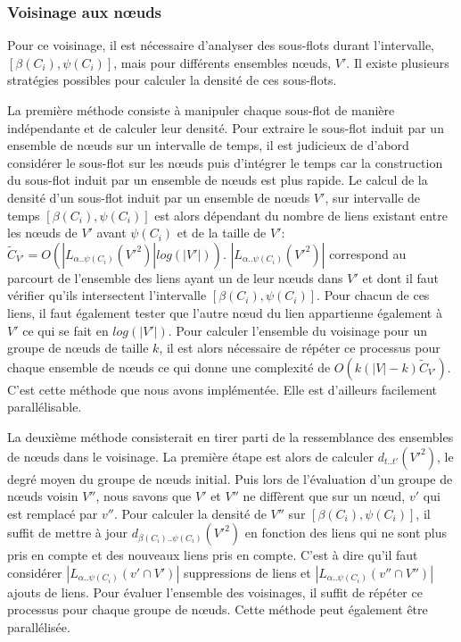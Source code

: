 \subsubsection{Voisinage aux n\oe uds}
Pour ce voisinage, il est nécessaire d'analyser des sous-flots durant l'intervalle, $[\beta(C_i),\psi(C_i)]$, mais pour différents ensembles n\oe uds, $V'$.
Il existe plusieurs stratégies possibles pour calculer la densité  de ces sous-flots. 

La première méthode consiste à manipuler chaque sous-flot de manière indépendante et de calculer leur densité.
Pour extraire le sous-flot induit par un ensemble de n\oe uds sur un intervalle de temps,
il est judicieux de d'abord considérer le sous-flot sur les n\oe uds puis d'intégrer le temps  car la construction du sous-flot induit par un ensemble de n\oe uds est plus rapide.
Le calcul de la densité d'un sous-flot induit par un ensemble de n\oe uds $V'$, sur intervalle de temps $[\beta(C_i),\psi(C_i)]$ est alors dépendant du nombre de liens existant entre les n\oe uds de $V'$ avant $\psi(C_i)$ et de la taille de $V'$: $\tilde{C}_{V'}=O(|L_{\alpha..\psi(C_i)}(V'^2)|log(|V'|))$.
$|L_{\alpha..\psi(C_i)}(V'^2)|$ correspond au parcourt de l'ensemble des liens ayant un de leur n\oe uds dans $V'$ et dont il faut vérifier  qu'ils intersectent l'intervalle $[\beta(C_i),\psi(C_i)]$.
Pour chacun de ces liens, il faut également tester que l'autre n\oe ud du lien appartienne également à $V'$ ce qui se fait en $log(|V'|)$.
Pour calculer l'ensemble du voisinage pour un groupe de n\oe uds de taille $k$, il est alors nécessaire de répéter ce processus pour chaque ensemble de n\oe uds ce qui donne une complexité de $O(k(|V|-k) \tilde{C}_{V'})$.
C'est cette méthode que nous avons implémentée.
Elle est d'ailleurs facilement parallélisable.

La deuxième méthode consisterait en tirer parti de la ressemblance des ensembles de n\oe uds dans le voisinage.
La première étape est alors de calculer $d_{t..t'}(V'^2)$, le degré moyen du groupe de n\oe uds initial.
Puis lors de l'évaluation d'un groupe de n\oe uds voisin $V''$, nous savons que $V'$ et $V''$ ne diffèrent que sur un n\oe ud, $v'$ qui est remplacé par $v''$.
Pour calculer la densité de $V''$ sur $[\beta(C_i),\psi(C_i)]$, il suffit de mettre à jour $d_{\beta(C_i)..\psi(C_i)}(V'^2)$ en fonction des liens qui ne sont plus pris en compte et des nouveaux liens pris en compte.
C'est à dire qu'il faut considérer $|L_{\alpha..\psi(C_i)}({v'} \cap V')|$ suppressions de liens et  $|L_{\alpha..\psi(C_i)}({v''} \cap V'')|$ ajouts de liens.
Pour évaluer l'ensemble des voisinages, il suffit de répéter ce processus pour chaque groupe de n\oe uds.
Cette méthode peut également être parallélisée.


